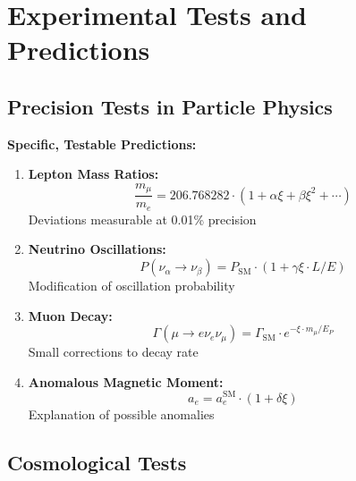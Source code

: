 \documentclass[12pt,a4paper]{article}
\begin{document}
	\section{Experimental Tests and Predictions}
	
	\subsection{Precision Tests in Particle Physics}
	
	\begin{application}
		\textbf{Specific, Testable Predictions:}
		
		\begin{enumerate}
			\item \textbf{Lepton Mass Ratios:}
			\begin{equation}
				\frac{m_\mu}{m_e} = 206.768282 \cdot (1 + \alpha \xi + \beta \xi^2 + \cdots)
			\end{equation}
			Deviations measurable at 0.01\% precision
			
			\item \textbf{Neutrino Oscillations:}
			\begin{equation}
				P(\nu_\alpha \to \nu_\beta) = P_{\text{SM}} \cdot (1 + \gamma \xi \cdot L/E)
			\end{equation}
			Modification of oscillation probability
			
			\item \textbf{Muon Decay:}
			\begin{equation}
				\Gamma(\mu \to e\nu_e\nu_\mu) = \Gamma_{\text{SM}} \cdot e^{-\xi \cdot m_\mu/E_P}
			\end{equation}
			Small corrections to decay rate
			
			\item \textbf{Anomalous Magnetic Moment:}
			\begin{equation}
				a_e = a_e^{\text{SM}} \cdot (1 + \delta \xi)
			\end{equation}
			Explanation of possible anomalies
		\end{enumerate}
	\end{application}
	
	\subsection{Cosmological Tests}
	
\end{document}
